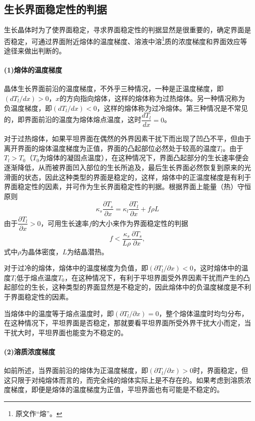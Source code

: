 \subsection{生长界面稳定性的判据}
生长晶体时为了使界面稳定，寻求界面稳定性的判据显然是很重要的，确定界面是否稳定，可通过界面附近熔体的温度梯度、溶液中溶\footnote{原文作“熔”。}质的浓度梯度和界面效应等途径来做出判断的。

\paragraph{(1)熔体的温度梯度}晶体生长界面前沿的温度梯度，不外乎三种情况，一种是正温度梯度，即$(dT_l/dx)>0$，$x$的方向指向熔体，这样的熔体称为过热熔体。另一种情况称为负温度梯度，即$(dT_l/dx)<0$，这样的熔体称为过冷熔体。第三种情况是不常见的，即界面前沿的温度为熔体熔点温度，这时$\dfrac{dT_l}{dx}=0$。

对于过热熔体，如果平坦界面在偶然的外界因素干扰下而出现了凹凸不平，但由于离开界面的熔体温度梯度为正值，界面的凸起部位必然处于较高的温度$T_l$。由于$T_l>T_0$（$T_0$为熔体的凝固点温度），在这种情况下，界面凸起部分的生长速率便会逐渐降低，从而被界面凹入部位的生长所追及，最后生长界面必然恢复到原来的光滑面的状态，因此这种类型的界面是稳定的，这样，熔体中的正温度梯度是有利于界面稳定性的因素，并可作为生长界面稳定性的判据。根据界面上能量（热）守恒原则
$$\kappa_s\frac{\partial T_s}{\partial x}=\kappa_l\frac{\partial T_l}{\partial x}+f\rho L$$
由于$\dfrac{\partial T_l}{\partial x}>0$，可用生长速率$f$的大小来作为界面稳定性的判据
\begin{equation}
f<\frac{\kappa_s}{L\rho}\frac{\partial T_s}{\partial x},
\end{equation}
式中$\rho$为晶体密度，$L$为结晶潜热。

对于过冷的熔体，熔体中的温度梯度为负值，即$(\partial T_l/\partial x)<0$，这时熔体中的温度$T_l$低于熔点温度$T_0$，在这种情况下，有利于平坦界面受外界因素干扰而产生的凸起部位的生长，这种类型的界面显然是不稳定的，因此熔体中的负温度梯度是不利于界面稳定性的因素。

当熔体中的温度等于熔点温度时，即$(\partial T_l/\partial x)=0$，整个熔体温度时均匀分布，在这种情况下，平坦界面是否稳定，那就要看平坦界面所受外界干扰大小而定，当干扰大时，平坦界面也能变为不稳定的。

\paragraph{(2)溶质浓度梯度}如前所述，当界面前沿的熔体为正温度梯度，即$(\partial T_l/\partial x)>0$时，界面稳定，但这只限于对纯熔体而言的，而完全纯的熔体实际上是不存在的。如果考虑到溶质浓度梯度，即便是熔体的温度梯度为正值，平坦界面也有可能是不稳定的。


